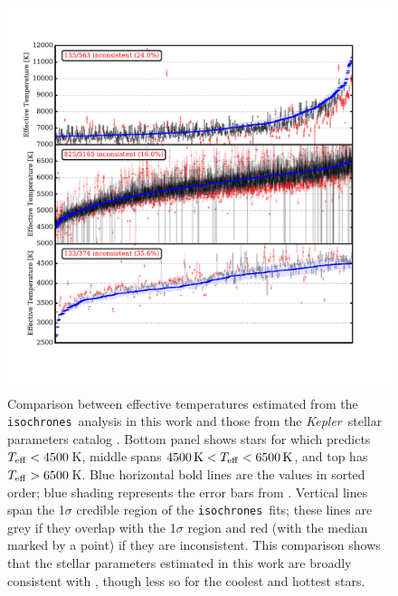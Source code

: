 \documentclass{emulateapj}
\newcommand{\figlabel}[1]{\label{fig:#1}}
\newcommand{\kepler}{\textit{Kepler}}
\newcommand{\isochrones}{\texttt{isochrones}}
\begin{document}
\clearpage

\clearpage

\begin{figure}[p]
\begin{center}
\includegraphics[width=7in]{figures/hubercompare_teff.pdf}
\end{center}
\caption{Comparison between effective temperatures estimated from the
  \isochrones\ analysis in this work and those from the
  \kepler\ stellar parameters catalog \citep[][hereafter
    ]{Huber:2014}.  Bottom panel shows stars
  for which  predicts $T_{\rm eff} < 4500$\,K,
  middle spans $4500\,{\rm K} < T_{\rm eff} < 6500\,{\rm K}$, and top
  has $T_{\rm eff} > 6500$\,K. Blue horizontal bold lines are the
   values in sorted order; blue shading
  represents the error bars from .  Vertical
  lines span the 1$\sigma$ credible region of the \isochrones\ fits;
  these lines are grey if they overlap with the
   1$\sigma$ region and red (with the median
  marked by a point) if they are inconsistent.  This comparison shows
  that the stellar parameters estimated in this work are broadly
  consistent with , though less so for the
  coolest and hottest stars.
\figlabel{starsteff}}
\end{figure}
\end{document}
